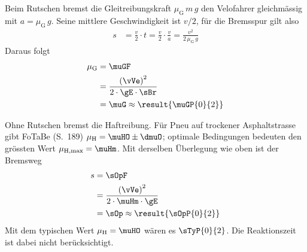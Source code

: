 Beim Rutschen bremst die Gleitreibungskraft $\mu_\mathrm{G}\,m\,g$ den Velofahrer gleichmässig mit $a = \mu_\mathrm{G}\,g$. Seine mittlere Geschwindigkeit ist $v/2$, für die Bremsspur gilt also
\begin{align}
 s &= \frac{v}{2}\cdot t = \frac{v}{2}\cdot\frac{v}{a} = \frac{v^2}{2\,\mu_\mathrm{G}\,g}
\end{align}
Daraus folgt
\begin{align}
 \mu_\mathrm{G} &= \muGF \\
   &= \frac{\left(\vVe\right)^2}{2\cdot\gE\cdot\sBr} \\
   &= \muG \approx \result{\muGP{0}{2}}
\end{align}

Ohne Rutschen bremst die Haftreibung. Für Pneu auf trockener Asphaltstrasse gibt FoTaBe (S.~189) $\mu_\mathrm{H} = \muHO\pm\dmuO$; optimale Bedingungen bedeuten den grössten Wert $\mu_\mathrm{H,max} = \muHm$. Mit derselben Überlegung wie oben ist der Bremsweg
\begin{align}
 s &= \sOpF \\
   &= \frac{\left(\vVe\right)^2}{2\cdot\muHm\cdot\gE} \\
   &= \sOp \approx \result{\sOpP{0}{2}}
\end{align}
Mit dem typischen Wert $\mu_\mathrm{H} = \muHO$ wären es $\sTyP{0}{2}$. Die Reaktionszeit ist dabei nicht berücksichtigt.
